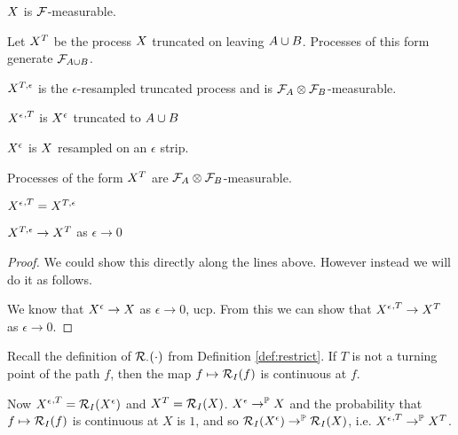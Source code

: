 {$X$ is $\mathcal{F}$-measurable.

\newcommand{\sampledT}{\sampled^T}
\newcommand{\sampledTe}{\sampled^{T,\epsilon}}
\newcommand{\resampledeT}{{\resamplede}^{,T}}

Let $\sampledT$ be the process $X$ truncated on leaving
$A \cup B$.  Processes of this form generate $\mathcal{F}_{A \cup B}$.

$\sampledTe$ is the $\epsilon$-resampled truncated process and is
$\mathcal{F}_A \otimes \mathcal{F}_B$-measurable.

$\resampledeT$ is $X^{\epsilon}$ truncated to $A \cup B$

$X^{\epsilon}$ is $X$ resampled on an $\epsilon$ strip.

\begin{lemma}
  Processes of the form $\sampledT$ are $\mathcal{F}_A \otimes
  \mathcal{F}_B$-measurable.
\end{lemma}

\begin{lemma}
  $\resampledeT = \sampledTe$
\end{lemma}

\begin{lemma}
  $\sampledTe \to \sampledT$ as $\epsilon \to 0$
\end{lemma}

\begin{proof}
  We could show this directly along the lines above.  However instead
  we will do it as follows.

  We know that $X^{\epsilon} \to X$ as $\epsilon \to 0$, ucp.
  From this we can show that $\resampledeT \to \sampledT$ as $\epsilon
  \to 0$.
\end{proof}

\begin{lemma}
  Recall the definition of $\mathcal{R}_{\cdot}(\cdot)$ from Definition
  \ref{def:restrict}.  If $T$ is not a turning point of the path $f$,
  then the map $f \mapsto \mathcal{R}_{I}(f)$ is continuous at $f$.
\end{lemma}

Now $\resampledeT = \restrict{I}{\resamplede}$ and $\sampledT =
\restrict{I}{\sampled}$.  $X^{\epsilon} \to^{\mathbb{P}} X$ and the
probability that $f \mapsto \mathcal{R}_{I}(f)$ is continuous at $X$ is
$1$, and so $\mathcal{R}_{I}(X^{\epsilon}) \to^{\mathbb{P}} \mathcal{R}_{I}(X)$,
i.e. $\resampledeT \to^\P \sampledT$.

}
